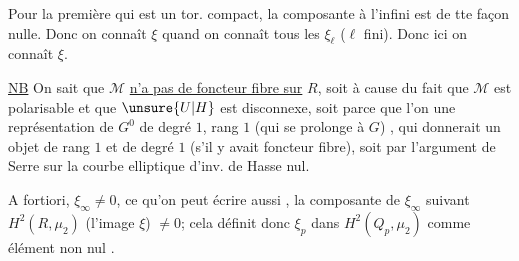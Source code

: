 Pour la première qui est un tor. compact, la composante à l'infini est de tte façon nulle. Donc on connaît $\xi$ quand on connaît tous les $\xi_\ell$ ($\ell$ fini). Donc ici on  connaît $\xi$.

\uline{NB} On sait  que $\mathcal M$ \uline{n'a pas de foncteur fibre sur} $R$,  soit à cause du fait que $\mathcal M$ est polarisable et que $\unsure{U|H}$ est disconnexe, soit parce que l'on   une représentation de $G^0$ de degré $1$, rang $1$ (qui se prolonge à $G$)  , qui donnerait un objet de  rang $1$ et de degré $1$ (s'il y avait foncteur fibre), soit par l'argument de Serre sur la courbe elliptique d'inv. de Hasse nul.

A fortiori, $\xi_\infty\ne0$, ce qu'on peut écrire aussi , la composante de $\xi_\infty$ suivant $H^2(R,\mu_2)$  (l'image   $\xi$) $\ne0$; cela définit donc  $\xi_p$  dans $H^2(Q_p,\mu_2)$ comme  élément non nul .
